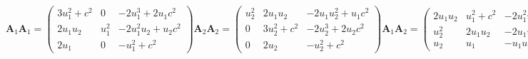 \documentclass[a4paper,12pt]{elsarticle}
\begin{document}
\begin{subequations}
\begin{equation}
\mathbf{A}_1\mathbf{A}_1 =
\begin{pmatrix}
3u_1^2 + c^2 & 0  & -2u_1^3 + 2u_1c^2 \\
2u_1u_2  & u_1^2  & -2u_1^2u_2 + u_2c^2 \\
2u_1  & 0   & -u_1^2 + c^2
\end{pmatrix}
\end{equation}
\begin{equation}
    \mathbf{A}_2\mathbf{A}_2 =
\begin{pmatrix}
u_2^2  & 2u_1u_2  & -2u_1u_2^2 + u_1c^2 \\
0    & 3u_2^2 + c^2 & -2u_2^3 + 2u_2c^2 \\
0  & 2u_2  & -u_2^2 + c^2
\end{pmatrix}
\end{equation}
\begin{equation}
\mathbf{A}_1\mathbf{A}_2 =
\begin{pmatrix}
2u_1u_2  & u_1^2 + c^2  & -2u_1^2u_2 \\
u_2^2  & 2u_1u_2  & -2u_1u_2^2 + u_1c^2 \\
u_2  & u_1  & -u_1u_2
\end{pmatrix}
\end{equation}
\begin{equation}
\mathbf{A}_2\mathbf{A}_1 =
\begin{pmatrix}
2u_1u_2  & u_1^2  & -2u_1^2u_2 + u_2c^2 \\
u_2^2 + c^2  & 2u_1u_2  & -2u_1u_2^2 \\
u_2  & u_1  & -u_1u_2
\end{pmatrix}
\end{equation}
\end{subequations}




\end{document}
